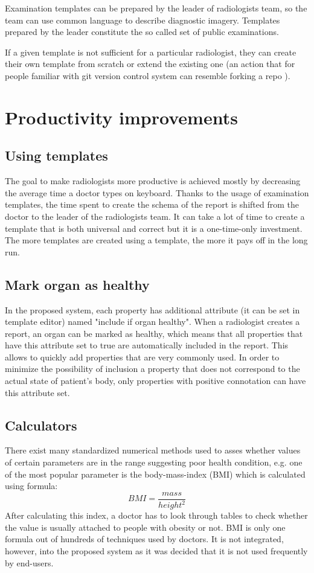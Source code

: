 \documentclass[12pt, twoside, openany]{report}
\theoremstyle{definition}
\begin{document}
Examination templates can be prepared by the leader of radiologists team, so the team can use common language to describe diagnostic imagery. Templates prepared by the leader constitute the so called set of public examinations.

If a given template is not sufficient for a particular radiologist, they can create their own template from scratch or extend the existing one (an action that for people familiar with git version control system can resemble forking a repo \cite{forking}).


\section{Productivity improvements}
\subsection{Using templates}
The goal to make radiologists more productive is achieved mostly by decreasing the average time a doctor types on keyboard. Thanks to the usage of examination templates, the time spent to create the schema of the report is shifted from the doctor to the leader of the radiologists team. It can take a lot of time to create a template that is both universal and correct but it is a one-time-only investment. The more templates are created using a template, the more it pays off in the long run.

\subsection{Mark organ as healthy}
In the proposed system, each property has additional attribute (it can be set in template editor) named "include if organ healthy". When a radiologist creates a report, an organ can be marked as healthy, which means that all properties that have this attribute set to true are automatically included in the report. This allows to quickly add properties that are very commonly used. 
In order to minimize the possibility of inclusion a property that does not correspond to the actual state of patient's body, only properties with positive connotation can have this attribute set. 

\subsection{Calculators}
There exist many standardized numerical methods used to asses whether values of certain parameters are in the range suggesting poor health condition, e.g. one of the most popular parameter is the body-mass-index (BMI) which is calculated using formula:
\begin{equation}
BMI=\frac{mass}{height^2}
\end{equation} 
After calculating this index, a doctor has to look through tables to check whether the value is usually attached to people with obesity or not. 
BMI is only one formula out of hundreds of techniques used by doctors. It is not integrated, however, into the proposed system as it was decided that it is not used frequently by end-users.
\end{document}
